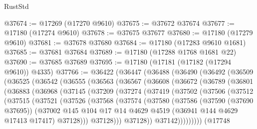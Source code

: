 \begin{lexlean}{RustStd}
\begin{coremodule}
{\begin{coremodule}
{{{{{{{{{{{{{{{{{{{{{{{{{{{{{{{{{{{{{{{{{{{{{{{{{{{{{{{@37674 := @17269 (@17270 @9610)
@37675 := @37672 @37674
@37677 := @17180 (@17274 @9610)
@37678 := @37675 @37677
@37680 := @17180 (@17279 @9610)
@37681 := @37678 @37680
@37684 := @17180 (@17283 @9610 @1681)
@37685 := @37681 @37684
@37689 := @17180 (@17288 @1768 @1681 @22)
@37690 := @37685 @37689
@37695 := @17180 (@17181 (@17182 (@17294 @9610)) @4335)
@37766 := @36422
    (@36447
      (@36488
        (@36490
          (@36492
            (@36509
              (@36525
                (@36542
                  (@36555
                    (@36563
                      (@36567
                        (@36608
                          (@36672
                            (@36789
                              (@36801
                                (@36883
                                  (@36968
                                    (@37145
                                      (@37209
                                        (@37274
                                          (@37419
                                            (@37502
                                              (@37506
                                                (@37512
                                                  (@37515
                                                    (@37521
                                                      (@37526
                                                        (@37568
                                                          (@37574
                                                            (@37580
                                                              (@37586
                                                                (@37590 (@37690 @37695))
                                                                (@37002
                                                                  @145
                                                                  @104
                                                                  @17
                                                                  @14
                                                                  @4629
                                                                  @4519
                                                                  (@36941 @144 @4629 @17413 @17417)
                                                                  @37128)))
                                                            @37128)))
                                                      @37128))
                                                  @37142)))))))))
                                (@17748
}}}}}}}}}}}}}}}}}}}}}}}}}}}}}}}}}}}}}}}}}}}}}}}}}}}}}}}
\end{coremodule}}
\end{coremodule}
\end{lexlean}

